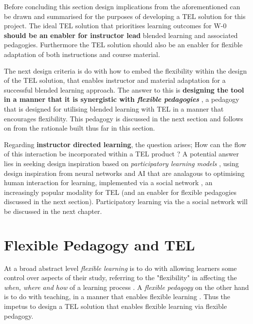 Before concluding this section design implications from the aforementioned can be drawn and summarised for the purposes of developing a TEL solution for this project. The ideal TEL solution that prioritises learning outcomes for W-0 \textbf{should be an enabler for instructor lead} blended learning and associated pedagogies. Furthermore the TEL solution should also be an enabler for flexible adaptation of both instructions and course material.

The next design criteria is do with how to embed the flexibility within the design of the TEL solution, that enables instructor and material adaptation for a successful blended learning approach. The answer to this is \textbf{designing the tool in a manner that it is synergistic with \textit{flexible pedagogies}} \cite{Gordon2014,Burge2011}, a pedagogy that is designed for utilising blended learning with TEL in a manner that encourages flexibility. This pedagogy is discussed in the next section and follows on from the rationale built thus far in this section.

Regarding \textbf{instructor directed learning}, the question arises; How can the flow of this  interaction be incorporated within a TEL product ? A potential answer lies in seeking design inspiration based on  \textit{participatory learning models} \cite{Yager1990,Yager2004}, using design inspiration from neural networks and AI  that are analagous to optimising human interaction for learning, implemented via a social network \cite{Gordon2014,Burge2011}, an increasingly popular modality for TEL (and an enabler for flexible pedagogies discussed in the next section). Participatory learning via the a social network will be discussed in the next chapter.


\newpage

\section{Flexible Pedagogy and TEL}

At a broad abstract level \textit{flexible learning} is to do with allowing learners some control over aspects of their study, referring to the "flexibility" in affecting the \textit{when, where and how} of a learning process \cite{Gordon2014,Burge2011}. A \textit{flexible pedagogy} on the other hand is to do with teaching, in a manner that enables flexible learning \cite{Gordon2014}. Thus the impetus to design a TEL solution that enables flexible learning via flexible pedagogy.

